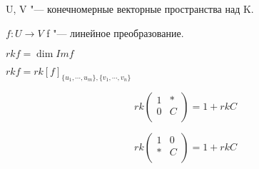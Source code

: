 \begin{Def}
U, V "--- конечномерные векторные пространства над K.

$f \colon U \to V$ f "--- линейное преобразование.

$rk f = \dim Im f$

$rk f = rk[f]_{\{u_1, \cdots, u_m\}, \{v_1, \cdots, v_n\}}$ 
\end{Def}

\begin{conseq}
$$
rk \begin{pmatrix} 1 & *\\ 0 & C\\ \end{pmatrix} = 1 + rk C
$$

$$
rk \begin{pmatrix} 1 & 0\\ * & C\\ \end{pmatrix} = 1 + rk C
$$
\end{conseq}
